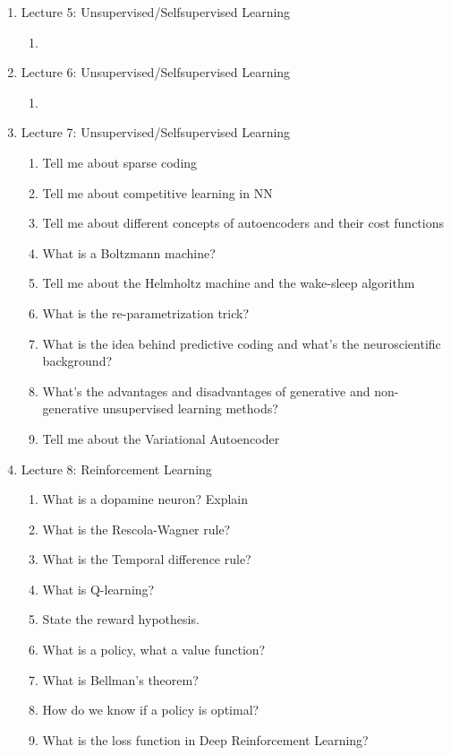 \documentclass[main]{subfiles}
\begin{document}
\begin{enumerate}
    \item{Lecture 5: Unsupervised/Selfsupervised Learning}
    \begin{enumerate}[label*=\arabic*.]
        \item 
    \end{enumerate}
    
    
    \item{Lecture 6: Unsupervised/Selfsupervised Learning}
    \begin{enumerate}[label*=\arabic*.]
        \item
    \end{enumerate}
    
    
    \item{Lecture 7: Unsupervised/Selfsupervised Learning}
    \begin{enumerate}[label*=\arabic*.]
        \item Tell me about sparse coding
        \item Tell me about competitive learning in NN
        \item Tell me about different concepts of autoencoders and their cost functions
        \item What is a Boltzmann machine?
        \item Tell me about the Helmholtz machine and the wake-sleep algorithm
        \item What is the re-parametrization trick?
        \item What is the idea behind predictive coding and what's the neuroscientific background?
        \item What's the advantages and disadvantages of generative and non-generative unsupervised learning methods?
        \item Tell me about the Variational Autoencoder
    \end{enumerate}
    
    \item{Lecture 8: Reinforcement Learning}
    \begin{enumerate}[label*=\arabic*.]
        \item What is a dopamine neuron? Explain
        \item What is the Rescola-Wagner rule?
        \item What is the Temporal difference rule?
        \item What is Q-learning?
        \item State the reward hypothesis.
        \item What is a policy, what a value function?
        \item What is Bellman's theorem?
        \item How do we know if a policy is optimal?
        \item What is the loss function in Deep Reinforcement Learning?
    \end{enumerate}


\end{enumerate}
\end{document}
